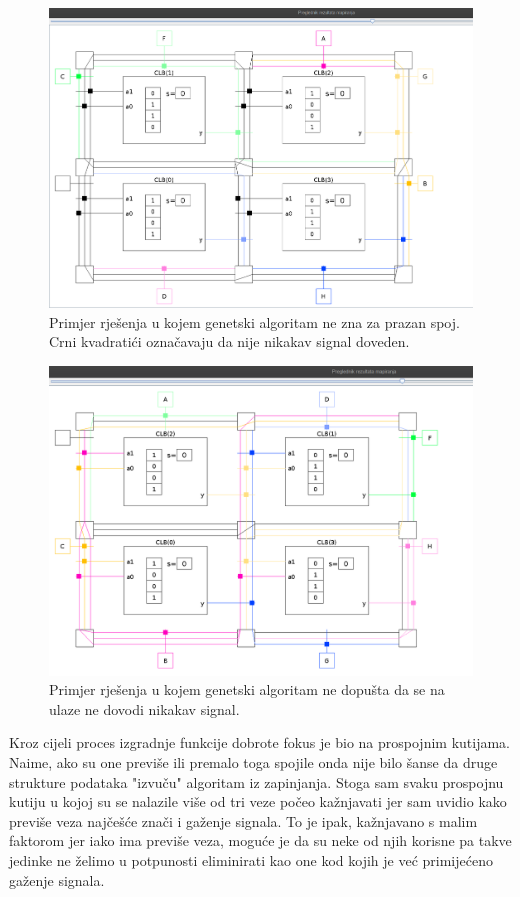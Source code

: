 \documentclass[times, utf8, zavrsni]{fer}
\begin{document}
	
	\begin{figure}[H]
		\centering
		\includegraphics[width=18cm]{slike/blackLabel.png}
		\caption{Primjer rješenja u kojem genetski algoritam ne zna za prazan spoj. Crni kvadratići označavaju da nije nikakav signal doveden. }
		\label{fig:black-label}
	\end{figure} 
	
	
	
	\begin{figure}[H]
		\centering
		\includegraphics[width=18cm]{slike/withoutBlackLabel.png}
		\caption{Primjer rješenja u kojem genetski algoritam ne dopušta da se na ulaze ne dovodi nikakav signal.}
		\label{fig:black-label}
	\end{figure} 
	
	
	Kroz cijeli proces izgradnje funkcije dobrote fokus je bio na prospojnim kutijama. Naime, ako su one previše ili premalo toga spojile onda nije bilo šanse da druge strukture podataka "izvuču" algoritam iz zapinjanja. Stoga sam svaku prospojnu kutiju u kojoj su se nalazile više od tri veze počeo kažnjavati jer sam uvidio kako previše veza najčešće znači i gaženje signala. To je ipak, kažnjavano s malim faktorom jer iako ima previše veza, moguće je da su neke od njih korisne pa takve jedinke ne želimo u potpunosti eliminirati kao one kod kojih je već primijećeno gaženje signala. 
	
\end{document}
